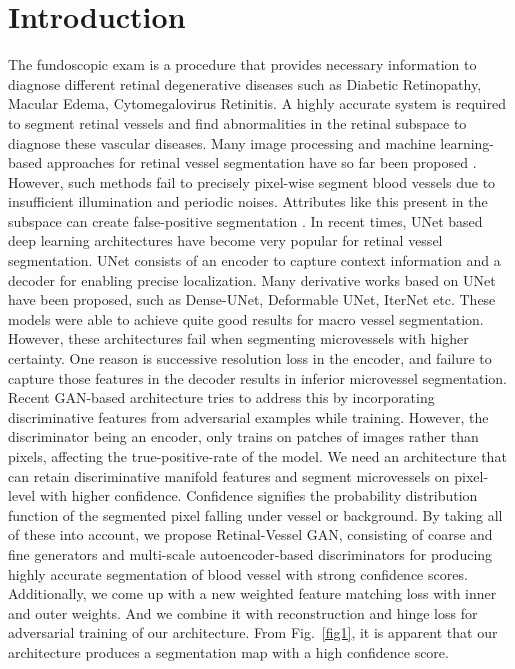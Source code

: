 \documentclass[runningheads]{llncs}
\begin{document}
\section{Introduction}
The fundoscopic exam is a procedure that provides necessary information to diagnose different retinal degenerative diseases such as Diabetic Retinopathy, Macular Edema, Cytomegalovirus Retinitis\cite{son2017retinal}. A highly accurate system is required to segment retinal vessels and find abnormalities in the retinal subspace to diagnose these vascular diseases. Many image processing and machine learning-based approaches for retinal vessel segmentation have so far been proposed \cite{soares2006retinal,fraz2012blood,ricci2007retinal,kamran2020improving}. However, such methods fail to precisely pixel-wise segment blood vessels due to insufficient illumination and periodic noises. \iffalse This becomes more problematic when extracting microvessels with the optic-disc present in the background. \fi  Attributes like this present in the subspace can create false-positive segmentation \cite{fraz2012blood}. 
In recent times, UNet based deep learning architectures have become very popular for retinal vessel segmentation. UNet consists of an encoder to capture context information and a decoder for enabling precise localization\cite{ronneberger2015u}. Many derivative works based on UNet have been proposed, such as Dense-UNet, Deformable UNet\cite{jin2019dunet}, IterNet \cite{li2020iternet} etc.  These models were able to achieve quite good results for macro vessel segmentation.  However, these architectures fail when segmenting microvessels with higher certainty. One reason is successive resolution loss in the encoder, and failure to capture those features in the decoder results in inferior microvessel segmentation. Recent GAN-based architecture \cite{park2020m,yang2020sud} tries to address this by incorporating discriminative features from adversarial examples while training. However, the discriminator being an encoder\cite{isola2017image}, only trains on patches of images rather than pixels, affecting the true-positive-rate of the model. We need an architecture that can retain discriminative manifold features and segment microvessels on pixel-level with higher confidence. Confidence signifies the probability distribution function of the segmented pixel falling under vessel or background. 
By taking all of these into account, we propose Retinal-Vessel GAN, consisting of coarse and fine generators and multi-scale autoencoder-based discriminators for producing highly accurate segmentation of blood vessel with strong confidence scores. Additionally, we come up with a new weighted feature matching loss with inner and outer weights. And we combine it with reconstruction and hinge loss for adversarial training of our architecture. From Fig.~\ref{fig1}, it is apparent that our architecture produces a segmentation map with a high confidence score. 
\end{document}
